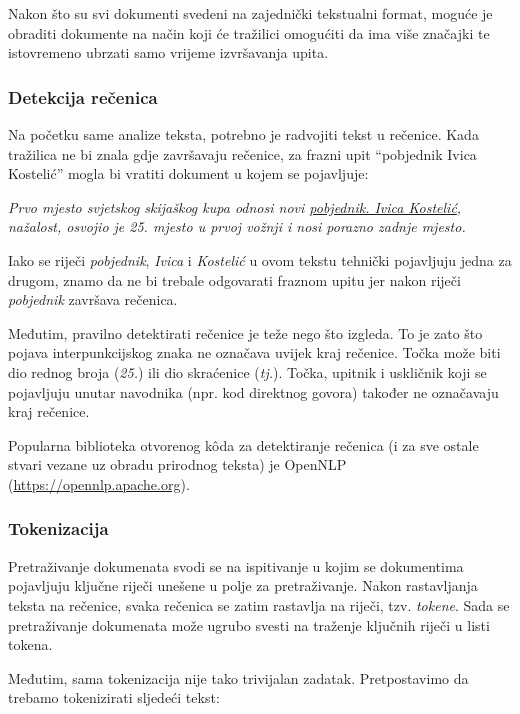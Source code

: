 \documentclass[a4paper,twoside,12pt]{scrreprt}
\begin{document}
Nakon što su svi dokumenti svedeni na zajednički tekstualni format, moguće je obraditi dokumente na način koji će tražilici omogućiti da ima više značajki te istovremeno ubrzati samo vrijeme izvršavanja upita.

\subsubsection{Detekcija rečenica}

Na početku same analize teksta, potrebno je radvojiti tekst u rečenice. Kada tražilica ne bi znala gdje završavaju rečenice, za frazni upit ``pobjednik Ivica Kostelić'' mogla bi vratiti dokument u kojem se pojavljuje:

\begin{quoting}
  \textit{Prvo mjesto svjetskog skijaškog kupa odnosi novi \underline{pobjednik. Ivica Kostelić}, nažalost, osvojio je 25. mjesto u prvoj vožnji i nosi porazno zadnje mjesto.}
\end{quoting}

Iako se riječi \textit{pobjednik}, \textit{Ivica} i \textit{Kostelić} u ovom tekstu tehnički pojavljuju jedna za drugom, znamo da ne bi trebale odgovarati fraznom upitu jer nakon riječi \textit{pobjednik} završava rečenica.

Međutim, pravilno detektirati rečenice je teže nego što izgleda. To je zato što pojava interpunkcijskog znaka ne označava uvijek kraj rečenice. Točka može biti dio rednog broja (\textit{25.}) ili dio skraćenice (\textit{tj.}). Točka, upitnik i uskličnik koji se pojavljuju unutar navodnika (npr. kod direktnog govora) također ne označavaju kraj rečenice.

Popularna biblioteka otvorenog kôda za detektiranje rečenica (i za sve ostale stvari vezane uz obradu prirodnog teksta) je OpenNLP (\url{https://opennlp.apache.org}).

\subsubsection{Tokenizacija}

Pretraživanje dokumenata svodi se na ispitivanje u kojim se dokumentima pojavljuju ključne riječi unešene u polje za pretraživanje. Nakon rastavljanja teksta na rečenice, svaka rečenica se zatim rastavlja na riječi, tzv. \textit{tokene}. Sada se pretraživanje dokumenata može ugrubo svesti na traženje ključnih riječi u listi tokena.

Međutim, sama tokenizacija nije tako trivijalan zadatak. Pretpostavimo da trebamo tokenizirati sljedeći tekst:
\end{document}
